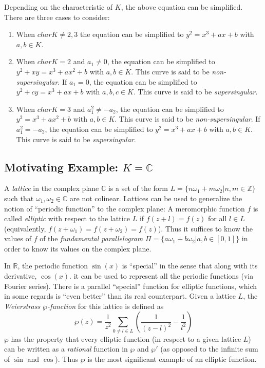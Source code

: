 \documentclass[11pt,english]{article}
\begin{document}
Depending on the characteristic of $K$, the above equation can be simplified. There are three cases to consider:
\begin{enumerate}
  \item When $charK\ne 2,3$ the equation can be simplified to $y^2=x^3+ax+b$ with $a,b\in K$.
  \item When $charK = 2$ and $a_1 \ne 0$, the equation can be simplified to $y^2+xy=x^3+ax^2+b$ with $a,b\in K$. This curve is said to be \emph{non-supersingular}. If $a_1 = 0$, the equation can be simplified to $y^2+cy=x^3+ax+b$ with $a,b,c\in K$. This curve is said to be \emph{supersingular}.
  \item When $charK = 3$ and $a_1^2\ne -a_2$, the equation can be simplified to $y^2=x^3+ax^2+b$ with $a,b\in K$. This curve is said to be \emph{non-supersingular}. If $a_1^2=-a_2$, the equation can be simplified to $y^2=x^3+ax+b$ with $a,b\in K$. This curve is said to be \emph{supersingular}.
\end{enumerate}

\subsection{Motivating Example: $K=\mathbb{C}$}
A \emph{lattice} in the complex plane $\mathbb{C}$ is a set of the form $L=\{n\omega_1+m\omega_2|n,m\in\mathbb{Z}\}$ such that $\omega_1,\omega_2\in\mathbb{C}$ are
not colinear. Lattices can be used to generalize the notion of ``periodic function'' to the complex plane: A meromorphic function $f$ is called \emph{elliptic} with respect to the lattice
$L$ if $f(z+l)=f(z)$ for all $l\in L$ (equivalently, $f(z+\omega_1)=f(z+\omega_2)=f(z)$). Thus it suffices to know the values of $f$ of the \emph{fundamental parallelogram} $\Pi=\{a\omega_1+b\omega_2|a,b\in[0,1]\}$
in order to know its values on the complex plane.

In $\mathbb{R}$, the periodic function $\sin(x)$ is ``special'' in the sense that along with its derivative, $\cos(x)$. it can be used to represent all
the periodic functions (via Fourier series). There is a parallel ``special'' function for elliptic functions, which in some regards is ``even better'' than its real counterpart. 
Given a lattice $L$, the \emph{Weierstrass $\wp$-function} for this lattice is defined as $$\wp(z)=\frac{1}{z^2}\sum_{0\ne l\in L}\left(\frac{1}{(z-l)^2}-\frac{1}{l^2}\right)$$
$\wp$ has the property that every elliptic function (in respect to a given lattice $L$) can be written as a \emph{rational} function in $\wp$ and $\wp'$ (as opposed to the
infinite sum of $\sin$ and $\cos$). Thus $\wp$ is the most significant example of an elliptic function.
\end{document}
